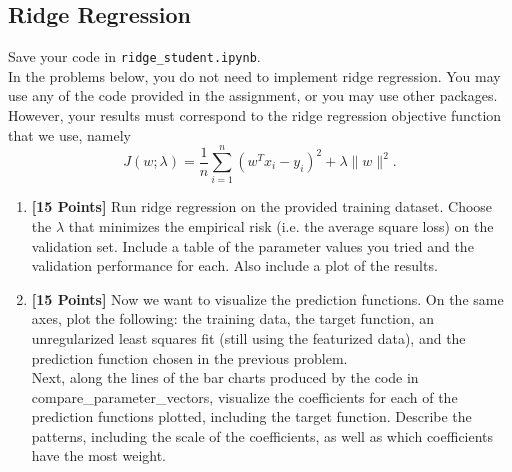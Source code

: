 \documentclass{article}
\begin{document}
\subsection*{Ridge Regression}
Save your code in \texttt{ridge\_student.ipynb}. \\
In the problems below, you do not need to implement ridge regression.
You may use any of the code provided in the assignment, or you may
use other packages. However, your results must correspond to the ridge
regression objective function that we use, namely
\[
J(w;\lambda)=\frac{1}{n}\sum_{i=1}^{n}\left(w^{T}x_{i}-y_{i}\right)^{2}+\lambda\|w\|^{2}.
\]
\begin{enumerate}
\item {\bf [15 Points]} Run ridge regression on the provided training dataset. Choose the
$\lambda$ that minimizes the empirical risk (i.e. the average square
loss) on the validation set. Include a table of the parameter values
you tried and the validation performance for each. Also include a
plot of the results.
\item {\bf [15 Points]} Now we want to visualize the prediction functions. On the same axes,
plot the following: the training data, the target function, an unregularized
least squares fit (still using the featurized data), and the prediction
function chosen in the previous problem. 
\\ Next, along the lines of
the bar charts produced by the code in compare\_parameter\_vectors,
visualize the coefficients for each of the prediction functions plotted,
including the target function. Describe the patterns, including the
scale of the coefficients, as well as which coefficients have the
most weight.
\end{enumerate}
\end{document}
